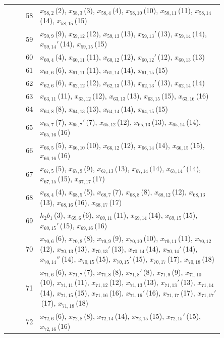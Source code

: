 \documentclass[11pt]{article}
\begin{document}
\begin{center}
\begin{longtable}{r>{\raggedright\arraybackslash}p{0.85\linewidth}}
58 & $x_{58,2}$\,(2), $x_{58,3}$\,(3), $x_{58,4}$\,(4), $x_{58,10}$\,(10), $x_{58,11}$\,(11), $x_{58,14}$\,(14), $x_{58,15}$\,(15) \\
59 & $x_{59,9}$\,(9), $x_{59,12}$\,(12), $x_{59,13}$\,(13), $x_{59,13}'$\,(13), $x_{59,14}$\,(14), $x_{59,14}'$\,(14), $x_{59,15}$\,(15) \\
60 & $x_{60,4}$\,(4), $x_{60,11}$\,(11), $x_{60,12}$\,(12), $x_{60,12}'$\,(12), $x_{60,13}$\,(13) \\
61 & $x_{61,6}$\,(6), $x_{61,11}$\,(11), $x_{61,14}$\,(14), $x_{61,15}$\,(15) \\
62 & $x_{62,6}$\,(6), $x_{62,12}$\,(12), $x_{62,13}$\,(13), $x_{62,13}'$\,(13), $x_{62,14}$\,(14) \\
63 & $x_{63,11}$\,(11), $x_{63,12}$\,(12), $x_{63,13}$\,(13), $x_{63,15}$\,(15), $x_{63,16}$\,(16) \\
64 & $x_{64,8}$\,(8), $x_{64,13}$\,(13), $x_{64,14}$\,(14), $x_{64,15}$\,(15) \\
65 & $x_{65,7}$\,(7), $x_{65,7}'$\,(7), $x_{65,12}$\,(12), $x_{65,13}$\,(13), $x_{65,14}$\,(14), $x_{65,16}$\,(16) \\
66 & $x_{66,5}$\,(5), $x_{66,10}$\,(10), $x_{66,12}$\,(12), $x_{66,14}$\,(14), $x_{66,15}$\,(15), $x_{66,16}$\,(16) \\
67 & $x_{67,5}$\,(5), $x_{67,9}$\,(9), $x_{67,13}$\,(13), $x_{67,14}$\,(14), $x_{67,14}'$\,(14), $x_{67,15}$\,(15), $x_{67,17}$\,(17) \\
68 & $x_{68,4}$\,(4), $x_{68,5}$\,(5), $x_{68,7}$\,(7), $x_{68,8}$\,(8), $x_{68,12}$\,(12), $x_{68,13}$\,(13), $x_{68,16}$\,(16), $x_{68,17}$\,(17) \\
69 & $h_2b_1$\,(3), $x_{69,6}$\,(6), $x_{69,11}$\,(11), $x_{69,14}$\,(14), $x_{69,15}$\,(15), $x_{69,15}'$\,(15), $x_{69,16}$\,(16) \\
70 & $x_{70,6}$\,(6), $x_{70,8}$\,(8), $x_{70,9}$\,(9), $x_{70,10}$\,(10), $x_{70,11}$\,(11), $x_{70,12}$\,(12), $x_{70,13}$\,(13), $x_{70,13}'$\,(13), $x_{70,14}$\,(14), $x_{70,14}'$\,(14), $x_{70,14}''$\,(14), $x_{70,15}$\,(15), $x_{70,15}'$\,(15), $x_{70,17}$\,(17), $x_{70,18}$\,(18) \\
71 & $x_{71,6}$\,(6), $x_{71,7}$\,(7), $x_{71,8}$\,(8), $x_{71,8}'$\,(8), $x_{71,9}$\,(9), $x_{71,10}$\,(10), $x_{71,11}$\,(11), $x_{71,12}$\,(12), $x_{71,13}$\,(13), $x_{71,13}'$\,(13), $x_{71,14}$\,(14), $x_{71,15}$\,(15), $x_{71,16}$\,(16), $x_{71,16}'$\,(16), $x_{71,17}$\,(17), $x_{71,17}'$\,(17), $x_{71,18}$\,(18) \\
72 & $x_{72,6}$\,(6), $x_{72,8}$\,(8), $x_{72,14}$\,(14), $x_{72,15}$\,(15), $x_{72,15}'$\,(15), $x_{72,16}$\,(16) \\

\end{longtable}
\end{center}
\end{document}
